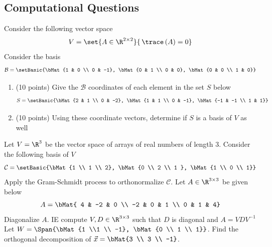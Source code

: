 \documentclass[12pt,addpoints]{exam}
\begin{document}
\begin{questions}
        \section*{Computational Questions}
        \question[20] Consider the following vector space
        \[
            V = \set{A\in\R^{2\times 2}}{\,\trace\left(A\right) = 0}
        \]
        Consider the basis
        \[
            \mathcal{B} = \setBasic{\bMat{1 & 0 \\ 0 & -1}, \bMat{0 & 1 \\ 0 & 0}, \bMat{0 & 0 \\ 1 & 0}}
        \]
        \begin{enumerate}
            \item(10 points) Give the $\mathcal{B}$ coordinates of each element in the set $S$ below
                \[
                    S = \setBasic{\bMat{2 & 1 \\ 0 & -2}, \bMat{1 & 1 \\ 0 & -1}, \bMat{-1 & -1 \\ 1 & 1}}
                \]
            \item(10 points) Using these coordinate vectors, determine if $S$ is a basis of $V$ as well
        \end{enumerate}
        \vfill
        \newpage
        \question[20] Let $V=\R^3$ be the vector space of arrays of real numbers of length 3. Consider
        the following basis of $V$
        \[
            \mathcal{C} = \setBasic{\bMat{1 \\ 1 \\ 2}, \bMat{0 \\ 2 \\ 1 }, \bMat{1 \\ 0 \\ 1}}
        \]
        Apply the Gram-Schmidt process to orthonormalize $\mathcal{C}$.
        \vfill
        \newpage
        \question[20] Let $A\in\R^{3\times 3}$ be given below
        \[
            A = \bMat{  4 & -2 & 0 \\
                        -2 & 0 & 1 \\
                        0 & 1 & 4}
        \]
        Diagonalize $A$. IE compute $V,D\in\R^{3\times 3}$ such that $D$ is diagonal and $A = VDV^{-1}$
        \vfill
        \newpage
        \question[20] Let $W = \Span{\bMat{1 \\1 \\ -1}, \bMat{0 \\ 1 \\ 1}}$. Find the orthogonal
        decomposition of $\vec{x} = \bMat{3 \\ 3 \\ -1}$.
        \vfill
        \newpage

\end{questions}
\end{document}
